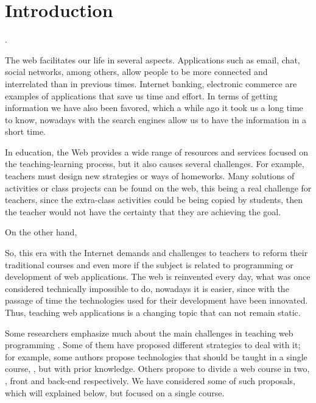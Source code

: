 \section{Introduction}
\label{sec:intro}

 \cite{cabada2018affective}.

The web facilitates our life in several aspects. Applications such as email, chat, social networks, among others, allow people to be more connected and interrelated than in previous times. Internet banking, electronic commerce are examples of applications that save us time and effort. In terms of getting 
information we have also been favored, which a while ago it took us a long time to know, nowadays with the search engines allow us to have the information in a short time. 

In education, the Web provides a wide range of resources and services focused on the teaching-learning process, but it also causes several challenges. For example, %
teachers must design new strategies or ways of homeworks.
Many solutions of activities or class projects can be found on the web, this being a real challenge for teachers, since the extra-class activities could be being copied by students, then the teacher would not have the certainty that they are achieving the goal. 

On the other hand, 

So, this era with the Internet demands and challenges to teachers to reform their 
traditional courses and even more if the subject is related to programming or 
development of web applications. The web is reinvented every day, what was once 
considered technically impossible to do, nowadays it is easier, since with the 
passage of time the technologies used for their development have been innovated. 
Thus, teaching web applications is a changing topic that can not remain static.

Some researchers emphasize much about the main challenges in teaching web programming 
\cite{9Wang2009,7XinogalosK2012,4Liu2011,Douce2018}. 
Some of them have proposed different strategies to deal with it; for example, some 
authors propose technologies that should be taught in a single course, 
\cite{4Liu2011,10Rosenbloom2017}, but with prior knowledge. 
Others propose to divide a web course in two, \cite{9Wang2009}, front and back-end 
respectively. 
We have considered some of such proposals, which will explained below, but focused on 
a single course.

